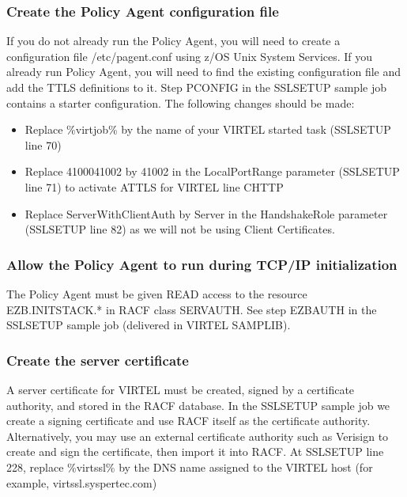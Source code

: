 \documentclass[letterpaper,10pt,english]{sphinxmanual}
\begin{document}
\subsubsection{Create the Policy Agent configuration file}
\label{\detokenize{Customization:create-the-policy-agent-configuration-file}}
\sphinxAtStartPar
If you do not already run the Policy Agent, you will need to create a configuration file /etc/pagent.conf using z/OS Unix System Services. If you already run Policy Agent, you will need to find the existing configuration file and add the TTLS definitions to it. Step PCONFIG in the SSLSETUP sample job contains a starter configuration. The following changes should be made:
\begin{itemize}
\item {} 
\sphinxAtStartPar
Replace \%virtjob\% by the name of your VIRTEL started task (SSLSETUP line 70)

\item {} 
\sphinxAtStartPar
Replace 41000\sphinxhyphen{}41002 by 41002 in the LocalPortRange parameter (SSLSETUP line 71) to activate AT\sphinxhyphen{}TLS for VIRTEL line C\sphinxhyphen{}HTTP

\item {} 
\sphinxAtStartPar
Replace ServerWithClientAuth by Server in the HandshakeRole parameter (SSLSETUP line 82) as we will not be using Client Certificates.

\end{itemize}


\subsubsection{Allow the Policy Agent to run during TCP/IP initialization}
\label{\detokenize{Customization:allow-the-policy-agent-to-run-during-tcp-ip-initialization}}
\sphinxAtStartPar
The Policy Agent must be given READ access to the resource EZB.INITSTACK.* in RACF class SERVAUTH. See step EZBAUTH in the SSLSETUP sample job (delivered in VIRTEL SAMPLIB).

\ignorespaces 

\subsubsection{Create the server certificate}
\label{\detokenize{Customization:create-the-server-certificate}}\label{\detokenize{Customization:index-101}}
\sphinxAtStartPar
A server certificate for VIRTEL must be created, signed by a certificate authority, and stored in the RACF database. In the SSLSETUP sample job we create a signing certificate and use RACF itself as the certificate authority. Alternatively, you may use an external certificate authority such as Verisign to create and sign the certificate, then import it into
RACF. At SSLSETUP line 228, replace \%virtssl\% by the DNS name assigned to the VIRTEL host (for example, virtssl.syspertec.com)
\end{document}
